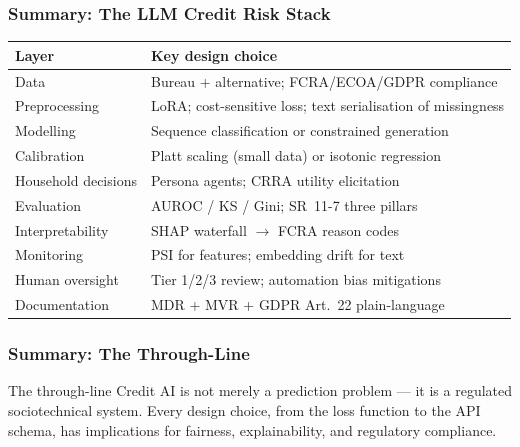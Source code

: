 \documentclass[9pt,t]{beamer}
\begin{document}
\begin{frame}
\frametitle{Summary: The LLM Credit Risk Stack}

\begin{center}
\begin{tabular}{ll}
\toprule
\textbf{Layer} & \textbf{Key design choice} \\
\midrule
Data & Bureau + alternative; FCRA/ECOA/GDPR compliance \\
Preprocessing & LoRA; cost-sensitive loss; text serialisation of missingness \\
Modelling & Sequence classification or constrained generation \\
Calibration & Platt scaling (small data) or isotonic regression \\
Household decisions & Persona agents; CRRA utility elicitation \\
Evaluation & AUROC / KS / Gini; SR~11-7 three pillars \\
Interpretability & SHAP waterfall $\to$ FCRA reason codes \\
Monitoring & PSI for features; embedding drift for text \\
Human oversight & Tier 1/2/3 review; automation bias mitigations \\
Documentation & MDR + MVR + GDPR Art.~22 plain-language \\
\bottomrule
\end{tabular}
\end{center}
\end{frame}

\begin{frame}
\frametitle{Summary: The Through-Line}

\begin{block}{The through-line}
  Credit AI is not merely a prediction problem --- it is a regulated sociotechnical system.
  Every design choice, from the loss function to the API schema, has implications for
  fairness, explainability, and regulatory compliance.
\end{block}
\end{frame}

\end{document}

